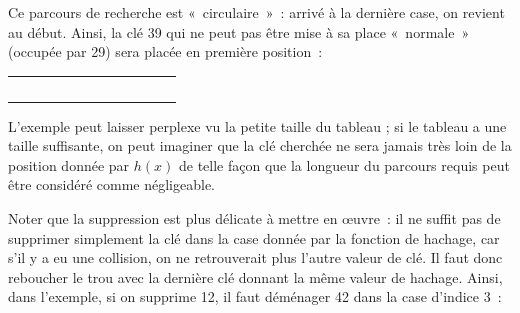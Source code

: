 		Ce parcours de recherche est «~circulaire~»~: arrivé à la dernière case, 
		on revient au début. Ainsi, la clé 39 qui ne peut pas être mise 
		à sa place «~normale~» (occupée par 29) sera placée en première position~:

		\begin{center}
			\tablefirsthead{}
			\tablehead{}
			\tabletail{}
			\tablelasttail{}
			\begin{supertabular}{m{0.999cm}m{0.999cm}m{0.999cm}m{0.999cm}m{0.999cm}m{0.999cm}m{0.999cm}m{0.999cm}m{0.999cm}m{0.999cm}}
			 &
			 &
			 &
			 &
			 &
			 &
			 &
			 &
			 &
			\centering{}\\\hline
			 &
			 &
			 &
			 &
			 &
			 &
			 &
			 &
			 &
			\\\hline
			\end{supertabular}
		\end{center}
		
		L'exemple peut laisser perplexe vu la petite taille du tableau ; 
		si le tableau a une taille suffisante, on peut imaginer
		que la clé cherchée ne sera jamais très loin de la position 
		donnée par $h(x)$ de telle façon que la
		longueur du parcours requis peut être considéré comme négligeable.

		Noter que la suppression est plus délicate à mettre en {\oe}uvre~: 
		il ne suffit pas de supprimer simplement la clé dans
		la case donnée par la fonction de hachage, car s'il y a eu une 
		collision, on ne retrouverait plus l'autre valeur de clé. 
		Il faut donc reboucher le trou avec la dernière clé donnant 
		la même valeur de hachage. Ainsi, dans l'exemple, si
		on supprime 12, il faut déménager 42 dans la case d'indice 3~:
		
		\bigskip

